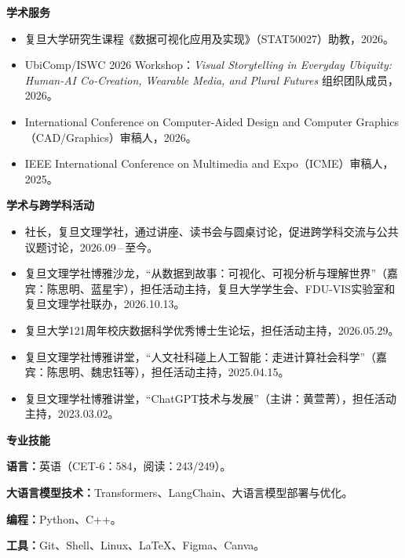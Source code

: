 \documentclass[10pt,a4paper]{article}
\newcommand{\bodyfont}{\fontsize{10.65pt}{14.1pt}\selectfont}
\newcommand{\cvsection}[1]{%
  \Needspace{2.6\baselineskip}%
  \vspace{9pt}%
  {\fontsize{11.6pt}{13.8pt}\selectfont\bfseries #1}\par
  \vspace{\dimexpr-\baselineskip+3.5pt\relax}%
  \noindent{\color{CVRule}\rule{\textwidth}{0.32pt}}\par
  \vspace{5pt}%
}
\newenvironment{cvitems}{%
  \begin{itemize}[leftmargin=1.22em,labelsep=0.42em,itemsep=3.0pt,topsep=0.45pt,parsep=0pt,partopsep=0pt]
  \bodyfont
}{\end{itemize}}
\newcommand{\skillline}[2]{%
  \textbf{#1}\hspace{0.5em}#2\par\vspace{3.0pt}%
}
\begin{document}
\cvsection{学术服务}
\begin{cvitems}
  \item 复旦大学研究生课程《数据可视化应用及实现》（STAT50027）助教，2026。
  \item UbiComp/ISWC 2026 Workshop：\textit{Visual Storytelling in Everyday Ubiquity: Human-AI Co-Creation, Wearable Media, and Plural Futures} 组织团队成员，2026。
  \item International Conference on Computer-Aided Design and Computer Graphics（CAD/Graphics）审稿人，2026。
  \item IEEE International Conference on Multimedia and Expo（ICME）审稿人，2025。
\end{cvitems}

\cvsection{学术与跨学科活动}
\begin{cvitems}
  \item 社长，复旦文理学社，通过讲座、读书会与圆桌讨论，促进跨学科交流与公共议题讨论，\mbox{2026.09\,--\,至今}。
  \item 复旦文理学社博雅沙龙，“从数据到故事：可视化、可视分析与理解世界”（嘉宾：陈思明、蓝星宇），担任活动主持，复旦大学学生会、FDU-VIS实验室和复旦文理学社联办，2026.10.13。
  \item 复旦大学121周年校庆数据科学优秀博士生论坛，担任活动主持，2026.05.29。
  \item 复旦文理学社博雅讲堂，“人文社科碰上人工智能：走进计算社会科学”（嘉宾：陈思明、魏忠钰等），担任活动主持，2025.04.15。
  \item 复旦文理学社博雅讲堂，“ChatGPT技术与发展”（主讲：黄萱菁），担任活动主持，2023.03.02。
\end{cvitems}

\cvsection{专业技能}
\skillline{语言：}{英语（CET-6：584，阅读：243/249）。}
\skillline{大语言模型技术：}{Transformers、LangChain、大语言模型部署与优化。}
\skillline{编程：}{Python、C++。}
\skillline{工具：}{Git、Shell、Linux、\LaTeX、Figma、Canva。}

\label{cvlastpage}
\end{document}
